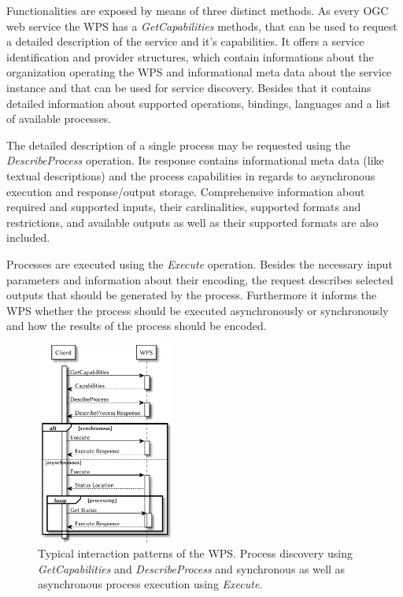 	Functionalities are exposed by means of three distinct methods. As every \ac{OGC} web service the \ac{WPS} has a \emph{GetCapabilities} methods, that can be used to request a detailed description of the service and it's capabilities. It offers a service identification and provider structures, which contain informations about the organization operating the \ac{WPS} and informational meta data about the service instance and that can be used for service discovery. Besides that it contains detailed information about supported operations, bindings, languages and a list of available processes.

	The detailed description of a single process may be requested using the \emph{DescribeProcess} operation. Its response contains informational meta data (like textual descriptions) and the process capabilities in regards to asynchronous execution and response/output storage. Comprehensive information about required and supported inputs, their cardinalities, supported formats and restrictions, and available outputs as well as their supported formats are also included.

	Processes are executed using the \emph{Execute} operation. Besides the necessary input parameters and information about their encoding, the request describes selected outputs that should be generated by the process. Furthermore it informs the \ac{WPS} whether the process should be executed asynchronously or synchronously and how the results of the process should be encoded.

	\begin{figure}[!htb]
		\centering
		\includegraphics[width=0.40140845070422537\textwidth]{figures/sequence-diagramm-wps.pdf}
		\caption{\label{fig:sd:wps}Typical interaction patterns of the \acl{WPS}. Process discovery using \emph{GetCapabilities} and \emph{DescribeProcess} and synchronous as well as asynchronous process execution using \emph{Execute}.}
	\end{figure}

